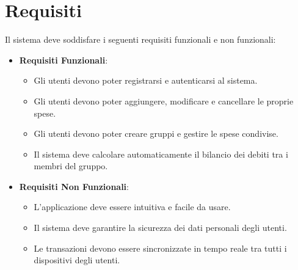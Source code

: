 \section{Requisiti}
Il sistema deve soddisfare i seguenti requisiti funzionali e non funzionali:
\begin{itemize}
    \item \textbf{Requisiti Funzionali}:
    \begin{itemize}
        \item Gli utenti devono poter registrarsi e autenticarsi al sistema.
        \item Gli utenti devono poter aggiungere, modificare e cancellare le proprie spese.
        \item Gli utenti devono poter creare gruppi e gestire le spese condivise.
        \item Il sistema deve calcolare automaticamente il bilancio dei debiti tra i membri del gruppo.
    \end{itemize}
    \item \textbf{Requisiti Non Funzionali}:
    \begin{itemize}
        \item L'applicazione deve essere intuitiva e facile da usare.
        \item Il sistema deve garantire la sicurezza dei dati personali degli utenti.
        \item Le transazioni devono essere sincronizzate in tempo reale tra tutti i dispositivi degli utenti.
    \end{itemize}
\end{itemize}
